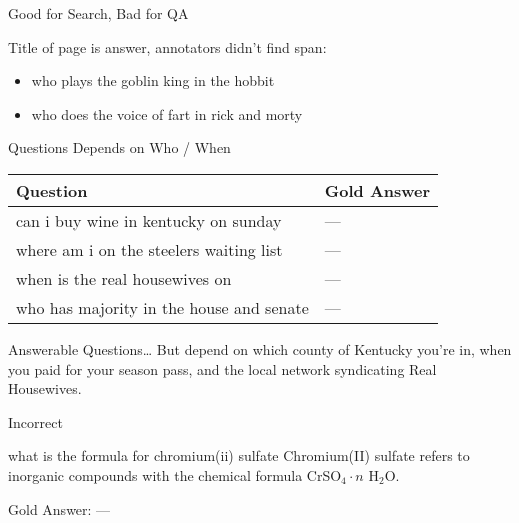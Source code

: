 \documentclass[xcolor=table]{beamer}
\begin{document}
\begin{frame}{Good for Search, Bad for QA}

  Title of page is answer, annotators didn't find span:
  \begin{itemize}
  \item who plays the goblin king in the hobbit
  \item who does the voice of fart in rick and morty
  \end{itemize}

\end{frame}

\begin{frame}{Questions Depends on Who / When}
  \begin{tabular}{p{8cm}p{2cm}}
    \toprule
    Question & Gold Answer \\
    \hline
    can i buy wine in kentucky on sunday & --- \\
    where am i on the steelers waiting list & --- \\
    when is the real housewives on & --- \\
    who has majority in the house and senate & --- \\
    \bottomrule
  \end{tabular}  

  \pause

  \begin{block}{Answerable Questions\dots}
  But depend on which county of Kentucky you're in,
  when you paid for your season pass, and the local network
  syndicating Real Housewives.
  \end{block}
  
\end{frame}


\begin{frame}{Incorrect}

  \begin{block}{what is the formula for chromium(ii) sulfate}
    Chromium(II) sulfate refers to inorganic compounds with the chemical formula CrSO$_4 \cdot n$ H$_2$O.
  \end{block}

  Gold Answer: ---

\end{frame}
\end{document}
